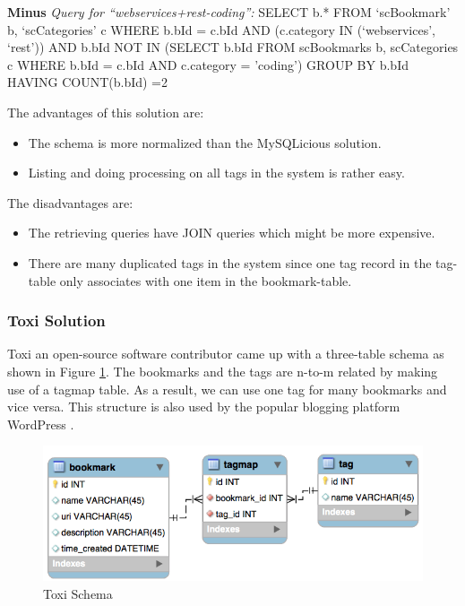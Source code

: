 \textbf{Minus}\newline
\textit{Query for ``webservices+rest-coding'':}\newline\newline
SELECT b.*\newline
FROM `scBookmark' b, `scCategories' c\newline
WHERE b.bId = c.bId\newline
AND (c.category IN (`webservices', `rest'))\newline
AND b.bId NOT\newline
IN (SELECT b.bId FROM scBookmarks b, scCategories c WHERE b.bId = c.bId AND c.category = 'coding')\newline
GROUP BY b.bId\newline
HAVING COUNT(b.bId) =2

The advantages of this solution are:
\begin{itemize}
   \item The schema is more normalized than the MySQLicious solution.
   \item Listing and doing processing on all tags in the system is rather easy.
\end{itemize}

The disadvantages are:
\begin{itemize}
   \item The retrieving queries have JOIN queries which might be more expensive.
   \item There are many duplicated tags in the system since one tag record in the tag-table only associates with one item in the bookmark-table.
\end{itemize}

\subsubsection{Toxi Solution}
Toxi \cite{toxi} an open-source software contributor came up with a three-table schema as shown in Figure \ref{fg:toxi}. The bookmarks and the tags are n-to-m related by making use of a tagmap table. As a result, we can use one tag for many bookmarks and vice versa. This structure is also used by the popular blogging platform WordPress \cite{wordpress}.

\begin{figure}[!h]
\begin{centering}
\includegraphics[scale=0.65]{pics/toxi}
\caption{Toxi Schema}\label{fg:toxi}
\end{centering}
\end{figure}

